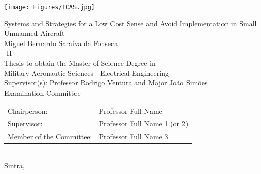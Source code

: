 \begin{center}
%
\vspace{2.0cm}
\texttt{[image: Figures/TCAS.jpg]}

\vspace{1.0cm}
{\FontLb Systems and Strategies for a Low Cost Sense and Avoid Implementation in Small Unmanned Aircraft} \\
\vspace{2.0cm}
{\FontMb Miguel Bernardo Saraiva da Fonseca} \\
{-H}\\
\vspace{2.0cm}
{\FontSn Thesis to obtain the Master of Science Degree in} \\
\vspace{0.3cm}
{\FontLb Military Aeronautic Sciences - Electrical Engineering} \\
\vspace{1.1cm}
{\FontSn Supervisor(s): Professor Rodrigo Ventura and Major Jo\~{a}o Sim\~{o}es} \\
\vspace{1.1cm}
{\FontMb Examination Committee} \\
\vspace{0.3cm}
{\FontSn %
\begin{tabular}{ll}
Chairperson: & Professor Full Name \\
Supervisor: & Professor Full Name 1 (or 2) \\
Member of the Committee: & Professor Full Name 3
\end{tabular} } \\
\vspace{1.5cm}
{\FontMb Sintra, \MONTH \: \the\year} \\
%
\end{center}

\cleardoublepage

